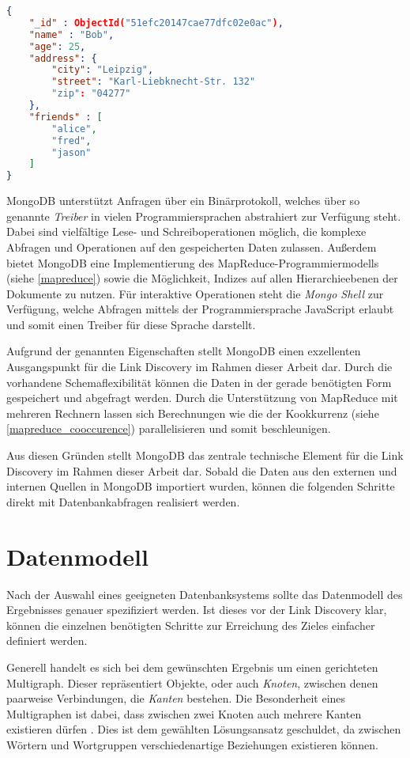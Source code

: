 \begin{lstlisting}[language=json, label={lst:json}, caption={Ein Beispiel für ein Dokument in MongoDB}]
{
    "_id" : ObjectId("51efc20147cae77dfc02e0ac"),
    "name" : "Bob",
    "age": 25,
    "address": {
        "city": "Leipzig",
        "street": "Karl-Liebknecht-Str. 132"
        "zip": "04277"
    },
    "friends" : [
        "alice",
        "fred",
        "jason"
    ]
}
\end{lstlisting}

MongoDB unterstützt Anfragen über ein Binärprotokoll, welches über so genannte \emph{Treiber} in vielen Programmiersprachen abstrahiert zur Verfügung steht. Dabei sind vielfältige Lese- und Schreiboperationen möglich, die komplexe Abfragen und Operationen auf den gespeicherten Daten zulassen. Außerdem bietet MongoDB eine Implementierung des MapReduce-Programmiermodells (siehe \ref{mapreduce}) sowie die Möglichkeit, Indizes auf allen Hierarchieebenen der Dokumente zu nutzen. Für interaktive Operationen steht die \emph{Mongo Shell} zur Verfügung, welche Abfragen mittels der Programmiersprache JavaScript erlaubt und somit einen Treiber für diese Sprache darstellt.

Aufgrund der genannten Eigenschaften stellt MongoDB einen exzellenten Ausgangspunkt für die Link Discovery im Rahmen dieser Arbeit dar. Durch die vorhandene Schemaflexibilität können die Daten in der gerade benötigten Form gespeichert und abgefragt werden. Durch die Unterstützung von MapReduce mit mehreren Rechnern lassen sich Berechnungen wie die der Kookkurrenz (siehe \ref{mapreduce_cooccurence}) parallelisieren und somit beschleunigen.

Aus diesen Gründen stellt MongoDB das zentrale technische Element für die Link Discovery im Rahmen dieser Arbeit dar. Sobald die Daten aus den externen und internen Quellen in MongoDB importiert wurden, können die folgenden Schritte direkt mit Datenbankabfragen realisiert werden.

\section{Datenmodell}

Nach der Auswahl eines geeigneten Datenbanksystems sollte das Datenmodell des Ergebnisses genauer spezifiziert werden. Ist dieses vor der Link Discovery klar, können die einzelnen benötigten Schritte zur Erreichung des Zieles einfacher definiert werden.

Generell handelt es sich bei dem gewünschten Ergebnis um einen gerichteten Multigraph. Dieser repräsentiert Objekte, oder auch \emph{Knoten}, zwischen denen paarweise Verbindungen, die \emph{Kanten} bestehen. Die Besonderheit eines Multigraphen ist dabei, dass zwischen zwei Knoten auch mehrere Kanten existieren dürfen \cite{rd2012}. Dies ist dem gewählten Lösungsansatz geschuldet, da zwischen Wörtern und Wortgruppen verschiedenartige Beziehungen existieren können.

